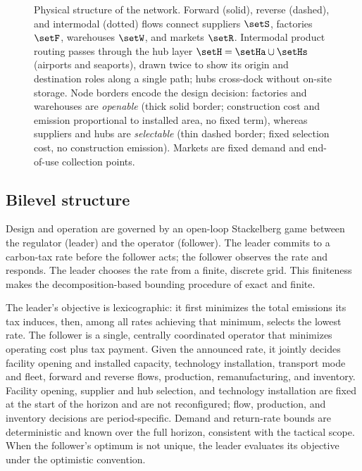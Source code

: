 \begin{figure}[tbp]
\begin{tikzpicture}
  \end{tikzpicture}
  \caption[Closed-loop supply chain network structure]{Physical structure of
    the \CLSC network. Forward (solid), reverse (dashed), and intermodal
    (dotted) flows connect suppliers $\setS$, factories $\setF$, warehouses
    $\setW$, and markets $\setR$. Intermodal product routing passes through
    the hub layer $\setH=\setHa\cup\setHs$ (airports and seaports), drawn
    twice to show its origin and destination roles along a single path; hubs
    cross-dock without on-site storage. Node borders encode the design
    decision: factories and warehouses are \emph{openable} (thick solid
    border; construction cost and emission proportional to installed area, no
    fixed term), whereas suppliers and hubs are \emph{selectable} (thin
    dashed border; fixed selection cost, no construction emission). Markets
    are fixed demand and end-of-use collection points.}
  \label{fig:network}
\end{figure}

\subsection{Bilevel structure}
\label{sec:prob:hierarchy}

Design and operation are governed by an open-loop Stackelberg game
between the regulator (leader) and the operator (follower). The leader
commits to a carbon-tax rate before the follower acts; the follower
observes the rate and responds. The leader chooses the rate from a
finite, discrete grid. This finiteness makes the decomposition-based
bounding procedure of  exact and finite.

The leader's objective is lexicographic: it first minimizes the total
emissions its tax induces, then, among all rates achieving that minimum,
selects the lowest rate. The follower is a single, centrally coordinated
operator that minimizes operating cost plus tax payment. Given the
announced rate, it jointly decides facility opening and installed
capacity, technology installation, transport mode and fleet, forward and
reverse flows, production, remanufacturing, and inventory. Facility
opening, supplier and hub selection, and technology installation are
fixed at the start of the horizon and are not reconfigured; flow,
production, and inventory decisions are period-specific. Demand and
return-rate bounds are deterministic and known over the full horizon,
consistent with the tactical scope. When the follower's optimum is not
unique, the leader evaluates its objective under the optimistic
convention.
